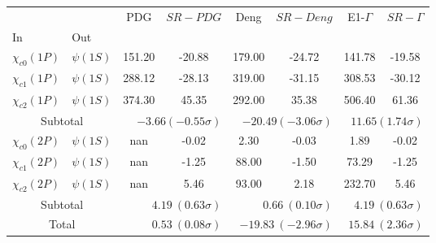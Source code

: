 \begin{tabular}{|l|l|c|c|c|c|c|c|}%
\hline%
&&PDG&$SR-PDG$&Deng&$SR-Deng$&E1-$\Gamma$&$SR-\Gamma$\\%
In&Out&&&&&&\\%
\hline%
$\chi_{c0}(1P)$&$\psi(1S)$&151.20&-20.88&179.00&-24.72&141.78&-19.58\\%
$\chi_{c1}(1P)$&$\psi(1S)$&288.12&-28.13&319.00&-31.15&308.53&-30.12\\%
$\chi_{c2}(1P)$&$\psi(1S)$&374.30&45.35&292.00&35.38&506.40&61.36\\%
\hline%
\hline%
\multicolumn{2}{|c|}{Subtotal}&\multicolumn{2}{|r|}{$-3.66 (-0.55\sigma)$}&\multicolumn{2}{|r|}{$-20.49 (-3.06\sigma)$}&\multicolumn{2}{|r|}{$11.65 (1.74\sigma)$}\\%
\hline%
\hline%
$\chi_{c0}(2P)$&$\psi(1S)$&nan&-0.02&2.30&-0.03&1.89&-0.02\\%
$\chi_{c1}(2P)$&$\psi(1S)$&nan&-1.25&88.00&-1.50&73.29&-1.25\\%
$\chi_{c2}(2P)$&$\psi(1S)$&nan&5.46&93.00&2.18&232.70&5.46\\%
\hline%
\hline%
\multicolumn{2}{|c|}{Subtotal}&\multicolumn{2}{|r|}{$4.19~(0.63\sigma)$}&\multicolumn{2}{|r|}{$0.66~(0.10\sigma)$}&\multicolumn{2}{|r|}{$4.19~(0.63\sigma)$}\\%
\hline%
\hline%
\multicolumn{2}{|c|}{Total}&\multicolumn{2}{|r|}{$0.53~(0.08\sigma)$}&\multicolumn{2}{|r|}{$-19.83~(-2.96\sigma)$}&\multicolumn{2}{|r|}{$15.84~(2.36\sigma)$}\\%
\hline%
\end{tabular}